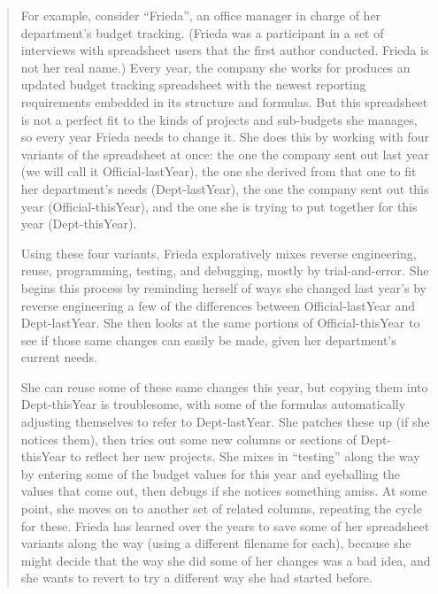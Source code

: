 \documentclass[english,submission]{programming}
\begin{document}
\begin{quotation}

For example, consider ``Frieda'', an office manager in charge of her department's budget tracking. (Frieda was a participant in a set of interviews with spreadsheet users that the first author conducted. Frieda is not her real name.) Every year, the company she works for produces an updated budget tracking spreadsheet with the newest reporting requirements embedded in its structure and formulas. But this spreadsheet is not a perfect fit to the kinds of projects and sub-budgets she manages, so every year Frieda needs to change it. She does this by working with four variants of the spreadsheet at once: the one the company sent out last year (we will call it Official-lastYear), the one she derived from that one to fit her department's needs (Dept-lastYear), the one the company sent out this year (Official-thisYear), and the one she is trying to put together for this year (Dept-thisYear).

Using these four variants, Frieda exploratively mixes reverse engineering, reuse, programming, testing, and debugging, mostly by trial-and-error. She begins this process by reminding herself of ways she changed last year's by reverse engineering a few of the differences between Official-lastYear and Dept-lastYear. She then looks at the same portions of Official-thisYear to see if those same changes can easily be made, given her department's current needs.

She can reuse some of these same changes this year, but copying them into Dept-thisYear is troublesome, with some of the formulas automatically adjusting themselves to refer to Dept-lastYear. She patches these up (if she notices them), then tries out some new columns or sections of Dept-thisYear to reflect her new projects. She mixes in ``testing'' along the way by entering some of the budget values for this year and eyeballing the values that come out, then debugs if she notices something amiss. At some point, she moves on to another set of related columns, repeating the cycle for these. Frieda has learned over the years to save some of her spreadsheet variants along the way (using a different filename for each), because she might decide that the way she did some of her changes was a bad idea, and she wants to revert to try a different way she had started before.
\end{quotation}
\end{document}
